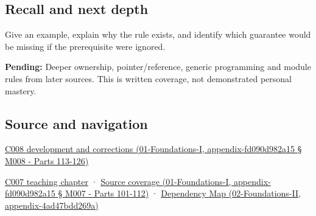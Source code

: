 \subsection{Recall and next depth}\label{recall-and-next-depth}

Give an example, explain why the rule exists, and identify which guarantee would be missing if the prerequisite were ignored.

\textbf{Pending:} Deeper ownership, pointer/reference, generic programming and module rules from later sources. This is written coverage, not demonstrated personal mastery.

\subsection{Source and navigation}\label{source-and-navigation}

\href{}{C008 development and corrections (01-Foundations-I, appendix-fd090d982a15 § M008 - Parts 113-126)}

\href{Continuous\%20Notes/Computing\%20Foundations\%20-\%20From\%20Bits\%20to\%20C++\%20and\%20Systems\%20APIs\#Values,\%20occupants\%20and\%20addresses\%20tell\%20different\%20stories}{C007 teaching chapter} · \href{}{Source coverage (01-Foundations-I, appendix-fd090d982a15 § M007 - Parts 101-112)} · \href{}{Dependency Map (02-Foundations-II, appendix-4ad47bdd269a)}
